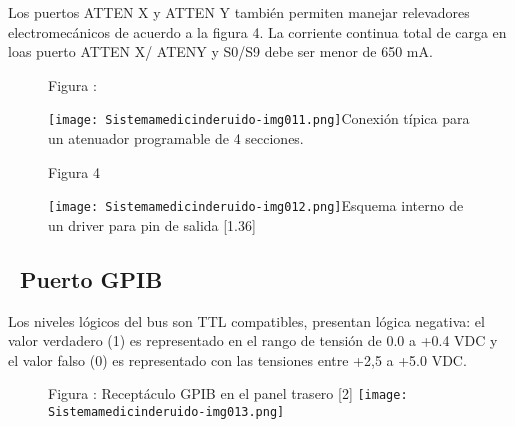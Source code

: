\documentclass[paper=letter,oneside,fontsize=10pt,parskip=full]{article}
\begin{document}
\bigskip


\bigskip


\bigskip


\bigskip


\bigskip


\bigskip


\bigskip


\bigskip


\bigskip

Los puertos ATTEN X y ATTEN Y también permiten manejar relevadores electromecánicos de acuerdo a la figura 4. La
corriente continua total de carga en loas puerto ATTEN X/ ATENY y S0/S9 debe ser menor de 650 mA.

\begin{figure}
\centering
\begin{minipage}{17.491cm}
Figura : 

\texttt{[image: Sistemamedicinderuido-img011.png]}Conexión típica para un atenuador programable de 4 secciones.
\end{minipage}
\end{figure}
 

\begin{figure}
\centering
\begin{minipage}{8.841cm}
Figura 4

\texttt{[image: Sistemamedicinderuido-img012.png]}Esquema interno de un driver para pin de salida [1.36]
\end{minipage}
\end{figure}
\subsection[\ Puerto GPIB ]{\ Puerto GPIB }
Los niveles lógicos del bus son TTL compatibles, presentan lógica negativa: el valor verdadero (1) es representado en el
rango de tensión de 0.0 a +0.4 VDC y el valor falso (0) es representado con las tensiones entre +2,5 a +5.0 VDC.


\bigskip



\begin{figure}
\centering
\begin{minipage}{10.028cm}
Figura : Receptáculo GPIB en el panel trasero [2]
\texttt{[image: Sistemamedicinderuido-img013.png]}\end{minipage}
\end{figure}

\bigskip


\bigskip
\end{document}
